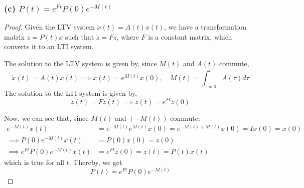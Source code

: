 \subsubsection*{(c) \( P(t)=e^{F t} P(0) e^{-M(t)} \)}

\begin{proof}
      Given the LTV system \( \dot{x}(t)=A(t) x(t) \), we have a transformation matrix \( z=P(t) x \) such that \( \dot{z}=F z \), where \( F \) is a constant matrix, which converts it to an LTI system.

      The solution to the LTV system is given by, since \( M(t) \) and \( A(t) \) commute,
      \begin{equation*}
            \dot{x}(t)
            =
            A(t) x(t)
            \implies
            x(t)
            =
            e^{M(t)} x(0),
            \quad
            M(t)
            =
            \int_{\tau=0}^{t} A(\tau) d \tau
      \end{equation*}
      The solution to the LTI system is given by,
      \begin{equation*}
            \dot{z}(t)
            =
            F z(t)
            \implies
            z(t)
            =
            e^{F t} z(0)
      \end{equation*}

      Now, we can see that, since \( M(t) \) and \( (-M(t)) \) commute:
      \begin{align*}
            e^{-M(t)} x(t)
             & =
            e^{-M(t)} e^{M(t)} x(0)
            =
            e^{-M(t) + M(t)} x(0)
            =
            I x(0)
            =
            x(0)
            \\
            \implies
            P(0) e^{-M(t)} x(t)
             & =
            P(0) x(0)
            =
            z(0)
            \\
            \implies
            e^{F t} P(0) e^{-M(t)} x(t)
             & =
            e^{F t} z(0)
            =
            z(t)
            =
            P(t) x(t)
      \end{align*}
      which is true for all \( t \).
      Thereby, we get
      \begin{equation*}
            \boxed{
                  P(t)
                  =
                  e^{F t} P(0) e^{-M(t)}
            }
      \end{equation*}
\end{proof}

